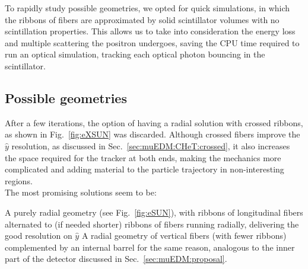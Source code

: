\begin{refsection}
    \noindent
    To rapidly study possible geometries, we opted for quick \gf simulations, in which the ribbons of fibers are approximated by solid scintillator volumes with no scintillation properties.
    This allows us to take into consideration the energy loss and multiple scattering the positron undergoes, saving the CPU time required to run an optical simulation, tracking each optical photon bouncing in the scintillator.\\

    \subsection{Possible geometries}
        After a few iterations, the option of having a radial solution with crossed ribbons, as shown in Fig.~\ref{fig:eXSUN} was discarded. 
        Although crossed fibers improve the $\hat{y}$ resolution, as discussed in Sec.~\ref{sec:muEDM:CHeT:crossed}, it also increases the space required for the tracker at both ends, making the mechanics more complicated and adding material to the particle trajectory in non-interesting regions.\\

        \noindent
        The most promising solutions seem to be:
        \begin{outline}
            \1 A purely radial geometry (see Fig.~\ref{fig:eSUN}), with ribbons of longitudinal fibers alternated to (if needed shorter) ribbons of fibers running radially, delivering the good resolution on $\hat{y}$
            \1 A radial geometry of vertical fibers (with fewer ribbons) complemented by an internal barrel for the same reason, analogous to the inner part of the detector discussed in Sec.~\ref{sec:muEDM:proposal}.
        \end{outline}


\end{refsection}
